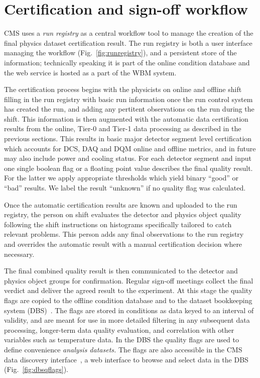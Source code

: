 \documentclass[a4paper]{jpconf}
\begin{document}
\section{Certification and sign-off workflow}\label{certification}

CMS uses a {\em run registry} as a central workflow tool to manage the
creation of the final physics dataset certification result.  The run registry
is both a user interface managing the workflow (Fig.~\ref{fig:runregistry}),
and a persistent store of the information; technically speaking it is part of
the online condition database and the web service is hosted as a part of the
WBM system.

The certification process begins with the physicists on online and offline
shift filling in the run registry with basic run information once the run
control system has created the run, and adding any pertitent observations on
the run during the shift.  This information is then augmented with the
automatic data certification results from the online, Tier-0 and Tier-1 data
processing as described in the previous sections.  This results in basic major
detector segment level certification which accounts for DCS, DAQ and DQM
online and offline metrics, and in future may also include power and cooling
status.  For each detector segment and input one single boolean flag or a
floating point value describes the final quality result.  For the latter we
apply appropriate thresholds which yield binary ``good'' or ``bad'' results.
We label the result ``unknown'' if no quality flag was calculated.

Once the automatic certification results are known and uploaded to the run
registry, the person on shift evaluates the detector and physics object
quality following the shift instructions on histograms specifically tailored
to catch relevant problems.  This person adds any final observations to the
run registry and overrides the automatic result with a manual certification
decision where necessary.

The final combined quality result is then communicated to the detector and
physics object groups for confirmation.  Regular sign-off meetings collect the
final verdict and deliver the agreed result to the experiment.  At this stage
the quality flags are copied to the offline condition database and to the
dataset bookkeeping system (DBS)~\cite{cms_dbs_07}.  The flags are stored in
conditions as data keyed to an interval of validity, and are meant for use in
more detailed filtering in any subsequent data processing, longer-term data
quality evaluation, and correlation with other variables such as temperature
data.  In the DBS the quality flags are used to define convenience {\em
  analysis datasets.}  The flags are also accessible in the CMS data discovery
interface~\cite{cms_dbs_discovery_07}, a web interface to browse and select
data in the DBS (Fig.~\ref{fig:dbsqflags}).
\end{document}
